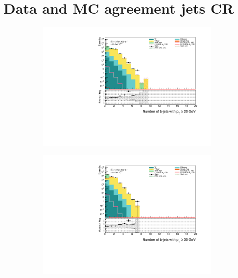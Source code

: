 \documentclass[12pt, a4paper]{book}
\begin{document}
\chapter{Data and MC agreement jets CR}\label{appendix:JetSelection}
\graphicspath{{../../Plots/Data_Analysis/JetSelection/Control_region/}} 
\begin{figure}[!ht]
    \centering
    \begin{subfigure}[b]{0.49\textwidth}
        \centering
        \includegraphics[width=\textwidth]{bjetsPt20.pdf}
    \end{subfigure}
    \hfill\begin{subfigure}[b]{0.49\textwidth}
        \centering
        \includegraphics[width=\textwidth]{bjetsPt30.pdf}
    \end{subfigure}
    \hfill\begin{subfigure}[b]{0.49\textwidth}

\end{subfigure}
\end{figure}
\end{document}
